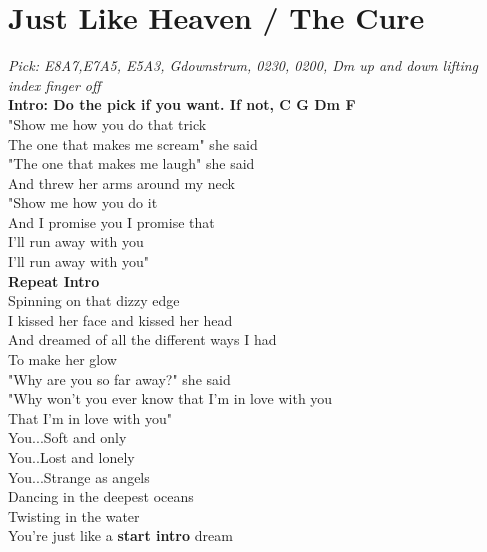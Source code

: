 \section{Just Like Heaven / The Cure}\label{sec:justlikeheaven}
\Cmajor
\Gmajor
\Dminor
\Fmajor
\Aminor
\BflatMajor

\emph{Pick: E8A7,E7A5, E5A3, Gdownstrum, 0230, 0200, Dm up and down lifting index finger off}  \\
\textbf{Intro: Do the pick if you want. If not, C G Dm F} \\
"Show me how you do that trick\\
The one that makes me scream" she said\\
"The one that makes me laugh" she said\\
And threw her arms around my neck\\
"Show me how you do it\\
And I promise you I promise that\\
I'll run away with you \\
I'll run away with you"\\
\textbf{Repeat Intro}\\
Spinning on that dizzy edge\\
I kissed her face and kissed her head\\
And dreamed of all the different ways I had\\
To make her glow\\
"Why are you so far away?" she said\\
"Why won't you ever know that I'm in love with you\\
That I'm in love with you"\\
You...Soft and only\\
You..Lost and lonely\\
You...Strange as angels\\
Dancing in the deepest oceans\\
Twisting in the water\\
You're just like a \textbf{start intro} dream\\
